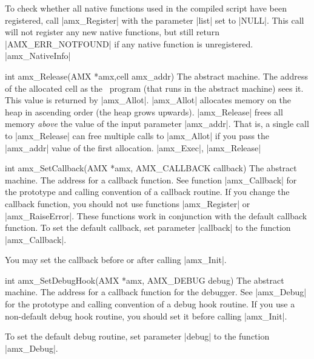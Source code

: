     To check whether all native functions used in the compiled script have been
    registered, call |amx_Register| with the parameter |list| set to |NULL|.
    This call will not register any new native functions, but still return
    |AMX_ERR_NOTFOUND| if any native function is unregistered.
\seealso |amx_NativeInfo|

\syntaxp int amx_Release(AMX *amx,cell amx_addr)
        The abstract machine.
        The address of the allocated cell as the \Small\ program (that runs in
        the abstract machine) sees it. This value is returned by |amx_Allot|.
\notes
    |amx_Allot| allocates memory on the heap in ascending order (the heap grows
    upwards). |amx_Release| frees all memory {\it above\/} the value of the
    input parameter |amx_addr|. That is, a single call to
    |amx_Release| can free multiple calls to |amx_Allot| if you pass the
    |amx_addr| value of the first allocation.
\seealso |amx_Exec|, |amx_Release|

\syntaxp int amx_SetCallback(AMX *amx, AMX_CALLBACK callback)
        The abstract machine.
        The address for a callback function. See function |amx_Callback| for
        the prototype and calling convention of a callback routine.
\notes
    If you change the callback function, you should not use functions
    |amx_Register| or |amx_RaiseError|. These functions work in conjunction
    with the default callback function. To set the default callback, set
    parameter |callback| to the function |amx_Callback|.

    You may set the callback before or after calling |amx_Init|.

\syntaxp int amx_SetDebugHook(AMX *amx, AMX_DEBUG debug)
        The abstract machine.
        The address for a callback function for the debugger. See |amx_Debug|
        for the prototype and calling convention of a debug hook routine.
\notes
    If you use a non-default debug hook routine, you should set it before
    calling |amx_Init|.

    To set the default debug routine, set parameter |debug| to the function
    |amx_Debug|.

